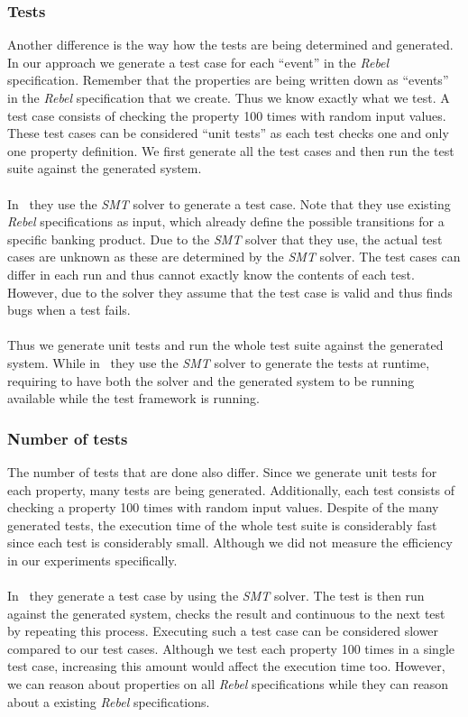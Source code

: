 \subsubsection{Tests}
Another difference is the way how the tests are being determined and generated. In our approach we generate a test case for each ``event'' in the \textit{Rebel} specification. Remember that the properties are being written down as ``events'' in the \textit{Rebel} specification that we create. Thus we know exactly what we test. A test case consists of checking the property 100 times with random input values. These test cases can be considered ``unit tests'' as each test checks one and only one property definition. We first generate all the test cases and then run the test suite against the generated system.\\
\\
In~\cite{tharumarajah2017runtime} they use the \textit{SMT} solver to generate a test case. Note that they use existing \textit{Rebel} specifications as input, which already define the possible transitions for a specific banking product. Due to the \textit{SMT} solver that they use, the actual test cases are unknown as these are determined by the \textit{SMT} solver. The test cases can differ in each run and thus cannot exactly know the contents of each test. However, due to the solver they assume that the test case is valid and thus finds bugs when a test fails.\\
\\
Thus we generate unit tests and run the whole test suite against the generated system. While in~\cite{tharumarajah2017runtime} they use the \textit{SMT} solver to generate the tests at runtime, requiring to have both the solver and the generated system to be running available while the test framework is running.

\subsubsection{Number of tests}
The number of tests that are done also differ. Since we generate unit tests for each property, many tests are being generated. Additionally, each test consists of checking a property 100 times with random input values. Despite of the many generated tests, the execution time of the whole test suite is considerably fast since each test is considerably small. Although we did not measure the efficiency in our experiments specifically.\\
\\
In~\cite{tharumarajah2017runtime} they generate a test case by using the \textit{SMT} solver. The test is then run against the generated system, checks the result and continuous to the next test by repeating this process. Executing such a test case can be considered slower compared to our test cases. Although we test each property 100 times in a single test case, increasing this amount would affect the execution time too. However, we can reason about properties on all \textit{Rebel} specifications while they can reason about a existing \textit{Rebel} specifications.
